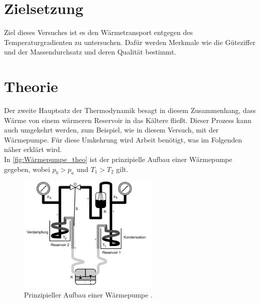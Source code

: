\section{Zielsetzung}
\label{sec:Zielsetzung}
Ziel dieses Versuches ist es den Wärmetransport entgegen des Temperaturgradienten zu untersuchen. 
Dafür werden Merkmale wie die Güteziffer und der Massendurchsatz und deren Qualität bestimmt.

\section{Theorie}
\label{sec:Theorie}
Der zweite Hauptsatz der Thermodynamik besagt in diesem Zusammenhang, dass Wärme von einem wärmeren Reservoir in das Kältere fließt.
Dieser Prozess kann auch umgekehrt werden, zum Beispiel, wie in diesem Versuch, mit der Wärmepumpe.
Für diese Umkehrung wird Arbeit benötigt, was im Folgenden näher erklärt wird.\\ 
In \autoref{fig:Wärmepumpe_theo} ist der prinzipielle Aufbau einer Wärmepumpe gegeben, wobei $p_b>p_a$ und $T_1>T_2$ gilt.
\begin{figure}[H]
    \centering
    \includegraphics[width=0.6\textwidth]{build/Abb1.png}
    \caption{Prinzipieller Aufbau einer Wärmepumpe \cite[196]{V206}.}
    \label{fig:Wärmepumpe_theo}
\end{figure}


